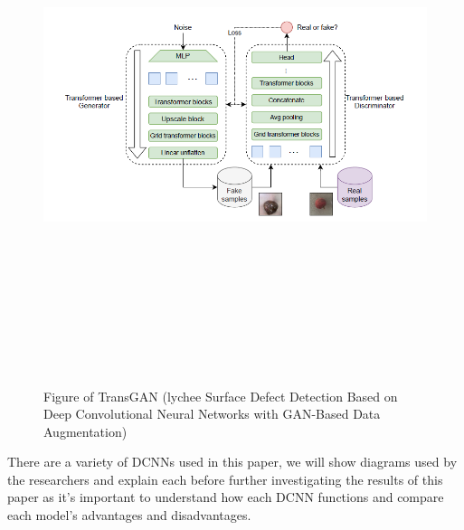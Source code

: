  \begin{figure}[H]
    \centering
    \includegraphics[width=1\textwidth,height=15cm,keepaspectratio]{Images/TransGan Figure.PNG}\\
    \caption{Figure of TransGAN (lychee Surface Defect Detection Based on Deep Convolutional Neural Networks with GAN-Based Data Augmentation)\cite{litReviewLychee}}
    \label{fig:Figure of TransGAN for lychee Classification Model (lychee Surface Defect Detection Based on Deep Convolutional Neural Networks with GAN-Based Data Augmentation)}
\end{figure}
\vspace{0.5mm}
There are a variety of DCNNs used in this paper, we will show diagrams used by the researchers and explain each before further investigating the results of this paper as it's important to understand how each DCNN functions and compare each model's advantages and disadvantages.

